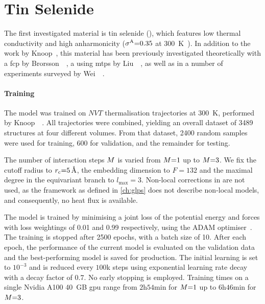 \section{Tin Selenide}
\label{sec:gk-snse}

The first investigated material is tin selenide (), which features low thermal conductivity and high anharmonicity ($\sigma^{\text{A}}{=}0.35$ at \qty{300}{K}~\cite{k2021t}).
In addition to the work by Knoop~\etal, this material has been previously investigated theoretically with a \gls{fcp} by Brorsson~\etal~\cite{bhke2021t}, a \mlp using \glspl{mtp} by Liu~\etal~\cite{lqzg2021q}, as well as in a number of experiments surveyed by Wei~\etal~\cite{wbcr2016t}.

\clearpage
\paragraph{Training}
The model was trained on \aimd $NVT$ thermalisation trajectories at \qty{300}{K}, performed by Knoop~\etal~\cite{kpsc2023t}. All trajectories were combined, yielding an overall dataset of \num{3489} structures at four different volumes. From that dataset, \num{2400} random samples were used for training, \num{600} for validation, and the remainder for testing.

The number of interaction steps $M$ is varied from $M{=}1$ up to $M{=}3$. We fix the cutoff radius to $r_{\text{c}}{=}\qty{5}{\angstrom}$, the embedding dimension to $F{=}132$ and the maximal degree in the equivariant branch to $l_{\text{max}}{=}3$. Non-local corrections in \sok are not used, as the \glp framework as defined in \cref{ch:glps} does not describe non-local models, and consequently, no heat flux is available.

The model is trained by minimising a joint loss of the potential energy and forces
with loss weightings of \num{0.01} and \num{0.99} respectively, using the ADAM optimiser~\cite{kb2014m}. The training is stopped after \num{2500} epochs, with a batch size of \num{10}. After each epoch, the performance of the current model is evaluated on the validation data and the best-performing model is saved for production. The initial learning is set to $10^{-3}$ and is reduced every $100$k steps using exponential learning rate decay with a decay factor of $0.7$. No early stopping is employed. Training times on a single Nvidia A100 \qty{40}{GB} \gls{gpu} range from $2$h$54$min for $M{=}1$ up to $6$h$46$min for $M{=}3$.

